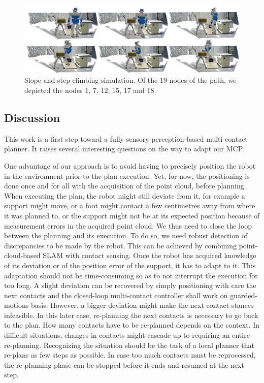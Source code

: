 \begin{figure}
  \centering
  \includegraphics[width=\linewidth]{hrp2slope.png}
  \caption{Slope and step climbing simulation. Of the 19 nodes of the path, we depicted the nodes 1, 7, 12, 15, 17 and 18.}
\label{fig:crapahut-simulation}
\end{figure}

\subsection{Discussion}
\label{sub:discussion_planning_pcl}

This work is a first step toward a fully sensory-perception-based multi-contact planner.
It raises several interesting questions on the way to adapt our MCP\@.

One advantage of our approach is to avoid having to precisely position the robot in the environment prior to the plan execution.
Yet, for now, the positioning is done once and for all with the acquisition of the point cloud, before planning.
When executing the plan, the robot might still deviate from it, for example a support might move, or a foot might contact a few centimetres away from where it was planned to, or the support might not be at its expected position because of measurement errors in the acquired point cloud.
We thus need to close the loop between the planning and its execution.
To do so, we need robust detection of discrepancies to be made by the robot.
This can be achieved by combining point-cloud-based SLAM with contact sensing.
Once the robot has acquired knowledge of its deviation or of the position error of the support, it has to adapt to it.
This adaptation should not be time-consuming so as to not interrupt the execution for too long.
A slight deviation can be recovered by simply positioning with care the next contacts and the closed-loop multi-contact controller shall work on guarded-motions basis.
However, a bigger deviation might make the next contact stances infeasible.
In this later case, re-planning the next contacts is necessary to go back to the plan.
How many contacts have to be re-planned depends on the context.
In difficult situations, changes in contacts might cascade up to requiring an entire re-planning.
Recognizing the situation should be the task of a local planner that re-plans as few steps as possible.
In case too much contacts must be reprocessed, the re-planning phase can be stopped before it ends and resumed at the next step.

